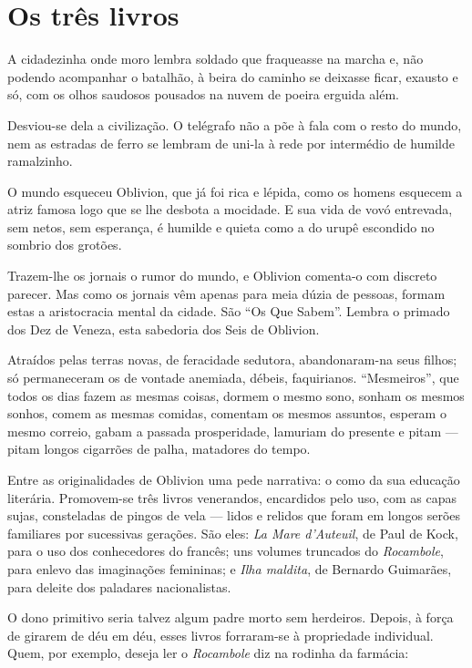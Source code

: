\section{Os três livros}

A cidadezinha onde moro lembra soldado que fraqueasse na marcha e, não
podendo acompanhar o batalhão, à beira do caminho se deixasse ficar,
exausto e só, com os olhos saudosos pousados na nuvem de poeira erguida
além.

Desviou-se dela a civilização. O telégrafo não a põe à fala com o resto
do mundo, nem as estradas de ferro se lembram de uni-la à rede por
intermédio de humilde ramalzinho.

O mundo esqueceu Oblivion, que já foi rica e lépida, como os homens
esquecem a atriz famosa logo que se lhe desbota a mocidade. E sua vida
de vovó entrevada, sem netos, sem esperança, é humilde e quieta como a
do urupê escondido no sombrio dos grotões.

Trazem-lhe os jornais o rumor do mundo, e Oblivion comenta-o com
discreto parecer. Mas como os jornais vêm apenas para meia dúzia de
pessoas, formam estas a aristocracia mental da cidade. São ``Os Que
Sabem''. Lembra o primado dos Dez de Veneza, esta sabedoria dos Seis de
Oblivion.

Atraídos pelas terras novas, de feracidade sedutora, abandonaram-na seus
filhos; só permaneceram os de vontade anemiada, débeis, faquirianos.
``Mesmeiros'', que todos os dias fazem as mesmas coisas, dormem o mesmo
sono, sonham os mesmos sonhos, comem as mesmas comidas, comentam os
mesmos assuntos, esperam o mesmo correio, gabam a passada prosperidade,
lamuriam do presente e pitam --- pitam longos cigarrões de palha,
matadores do tempo.

Entre as originalidades de Oblivion uma pede narrativa: o como da sua
educação literária. Promovem-se três livros venerandos, encardidos pelo
uso, com as capas sujas, consteladas de pingos de vela --- lidos e
relidos que foram em longos serões familiares por sucessivas gerações.
São eles: \emph{La Mare d'Auteuil}, de Paul de Kock, para o uso dos
conhecedores do francês; uns volumes truncados do \emph{Rocambole}, para
enlevo das imaginações femininas; e \emph{Ilha maldita}, de Bernardo
Guimarães, para deleite dos paladares nacionalistas.

O dono primitivo seria talvez algum padre morto sem herdeiros. Depois, à
força de girarem de déu em déu, esses livros forraram-se à propriedade
individual. Quem, por exemplo, deseja ler o \emph{Rocambole} diz na
rodinha da farmácia:

